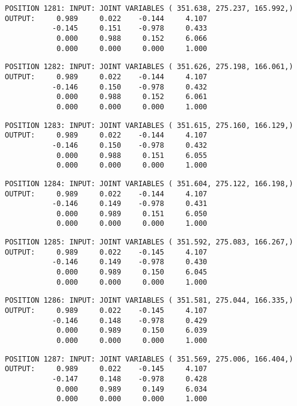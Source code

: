 \begin{verbatim}
POSITION 1281: INPUT: JOINT VARIABLES ( 351.638, 275.237, 165.992,)
OUTPUT:     0.989     0.022    -0.144     4.107
           -0.145     0.151    -0.978     0.433
            0.000     0.988     0.152     6.066
            0.000     0.000     0.000     1.000
\end{verbatim} \pagebreak[1]\begin{verbatim}
POSITION 1282: INPUT: JOINT VARIABLES ( 351.626, 275.198, 166.061,)
OUTPUT:     0.989     0.022    -0.144     4.107
           -0.146     0.150    -0.978     0.432
            0.000     0.988     0.152     6.061
            0.000     0.000     0.000     1.000
\end{verbatim} \pagebreak[1]\begin{verbatim}
POSITION 1283: INPUT: JOINT VARIABLES ( 351.615, 275.160, 166.129,)
OUTPUT:     0.989     0.022    -0.144     4.107
           -0.146     0.150    -0.978     0.432
            0.000     0.988     0.151     6.055
            0.000     0.000     0.000     1.000
\end{verbatim} \pagebreak[1]\begin{verbatim}
POSITION 1284: INPUT: JOINT VARIABLES ( 351.604, 275.122, 166.198,)
OUTPUT:     0.989     0.022    -0.144     4.107
           -0.146     0.149    -0.978     0.431
            0.000     0.989     0.151     6.050
            0.000     0.000     0.000     1.000
\end{verbatim} \pagebreak[1]\begin{verbatim}
POSITION 1285: INPUT: JOINT VARIABLES ( 351.592, 275.083, 166.267,)
OUTPUT:     0.989     0.022    -0.145     4.107
           -0.146     0.149    -0.978     0.430
            0.000     0.989     0.150     6.045
            0.000     0.000     0.000     1.000
\end{verbatim} \pagebreak[1]\begin{verbatim}
POSITION 1286: INPUT: JOINT VARIABLES ( 351.581, 275.044, 166.335,)
OUTPUT:     0.989     0.022    -0.145     4.107
           -0.146     0.148    -0.978     0.429
            0.000     0.989     0.150     6.039
            0.000     0.000     0.000     1.000
\end{verbatim} \pagebreak[1]\begin{verbatim}
POSITION 1287: INPUT: JOINT VARIABLES ( 351.569, 275.006, 166.404,)
OUTPUT:     0.989     0.022    -0.145     4.107
           -0.147     0.148    -0.978     0.428
            0.000     0.989     0.149     6.034
            0.000     0.000     0.000     1.000
\end{verbatim} \pagebreak[1]\begin{verbatim}

\end{verbatim}
